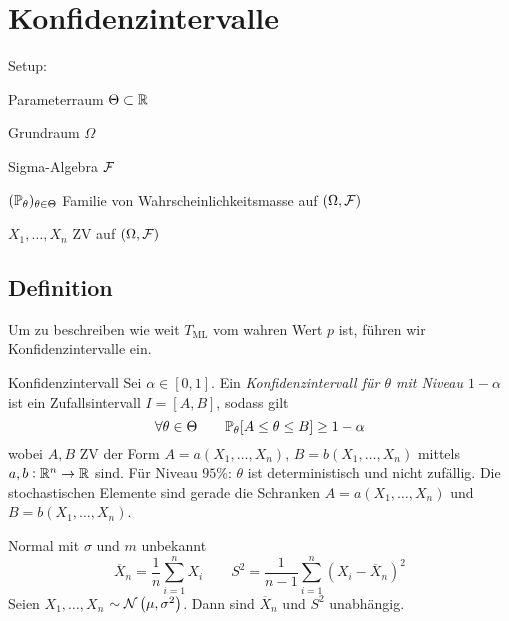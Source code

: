 \section*{Konfidenzintervalle}%
\label{sec:konfidenzintervalle}


Setup:
\begin{itemize*}
	\item Parameterraum $\Theta \subset \mathbb{R}$
\item Grundraum $\Omega$
	\item Sigma-Algebra $\mathcal{F}$
	\item $(\mathbb{P}_\theta)_{\theta \in \Theta}$ Familie von Wahrscheinlichkeitsmasse auf $(\Omega, \mathcal{F})$
	\item $X_1 , \ldots , X_n$ ZV auf $(\Omega, \mathcal{F})$
\end{itemize*}

\subsection*{Definition}%
\label{sub:definition}

Um zu beschreiben wie weit $T_{\text{ML}}$ vom wahren Wert $p$ ist, führen wir Konfidenzintervalle ein.
\begin{definition}{Konfidenzintervall}
	Sei $\alpha \in [0,1]$. Ein \emph{Konfidenzintervall für $\theta$ mit Niveau $1 - \alpha$} ist ein Zufallsintervall
	$I = [A,B]$, sodass gilt
	\begin{equation*}
		\forall \theta \in \Theta \qquad \mathbb{P}_\theta [A \leq \theta \leq B] \geq 1 - \alpha
	\end{equation*}
	wobei $A,B$ ZV der Form $A = a(X_1 , \ldots , X_n)$, $B = b(X_1, \ldots , X_n)$ mittels $a, b : \mathbb{R}^n \rightarrow \mathbb{R}$
	sind. Für Niveau $95\%$: 
	\tcblower
	$\theta$ ist deterministisch und nicht zufällig. Die stochastischen Elemente sind gerade die Schranken $A = a (X_1 ,
	\ldots , X_n)$ und $B = b (X_1 , \ldots , X_n)$.
\end{definition}

\begin{lemma}{Normal mit $\sigma$ und $m$ unbekannt}
	\begin{equation*}
		\overline{X}_n = \frac{1}{n} \sum_{i=1}^{n} X_i \qquad S^2 = \frac{1}{n-1} \sum_{i=1}^{n} \left( X_i - \overline{X}_n
		\right)^2
	\end{equation*}
	Seien $X_1 , \ldots , X_n$ \iid $\sim \mathcal{N} \left( \mu, \sigma^2 \right)$. Dann sind $\overline{X}_n$ und $S^2$
	unabhängig.
\end{lemma}

